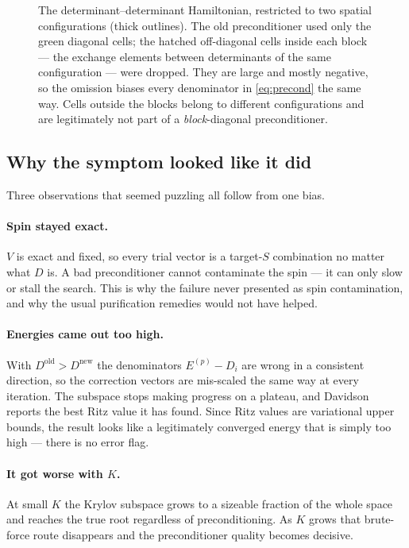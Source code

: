 \documentclass[11pt,a4paper]{article}
\begin{document}
\begin{figure}[t]
\begin{tikzpicture}[font=\small,scale=1.0]
\end{tikzpicture}
\caption{The determinant--determinant Hamiltonian, restricted to two spatial
configurations (thick outlines). The old preconditioner used only the green
diagonal cells; the hatched off-diagonal cells inside each block --- the
exchange elements between determinants of the same configuration --- were
dropped. They are large and mostly negative, so the omission biases every
denominator in \eqref{eq:precond} the same way. Cells outside the blocks
belong to different configurations and are legitimately not part of a
\emph{block}-diagonal preconditioner.}
\label{fig:matrix}
\end{figure}

\subsection*{Why the symptom looked like it did}

Three observations that seemed puzzling all follow from one bias.

\paragraph{Spin stayed exact.}
$V$ is exact and fixed, so every trial vector is a target-$S$ combination no
matter what $D$ is. A bad preconditioner cannot contaminate the spin --- it
can only slow or stall the search. This is why the failure never presented as
spin contamination, and why the usual purification remedies would not have
helped.

\paragraph{Energies came out too high.}
With $D^{\text{old}} > D^{\text{new}}$ the denominators
$E^{(p)} - D_i$ are wrong in a consistent direction, so the correction vectors
are mis-scaled the same way at every iteration. The subspace stops making
progress on a plateau, and Davidson reports the best Ritz value it has found.
Since Ritz values are variational upper bounds, the result looks like a
legitimately converged energy that is simply too high --- there is no
error flag.

\paragraph{It got worse with $K$.}
At small $K$ the Krylov subspace grows to a sizeable fraction of the whole
space and reaches the true root regardless of preconditioning. As $K$ grows
that brute-force route disappears and the preconditioner quality becomes
decisive.
\end{document}
